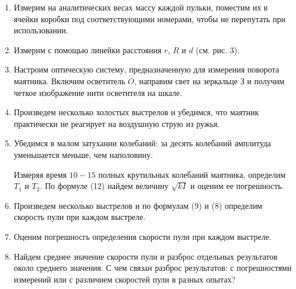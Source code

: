 \documentclass[14pt]{article}
\begin{document}
\begin{flushleft}
\begin{enumerate}
\item  Измерим на аналитических весах массу каждой пульки, поместим их в ячейки коробки под соответствующими номерами, чтобы не перепутать при использовании. 

\item  Измерим с помощью линейки расстояния $r$, $R$ и $d$ (см. рис. 3).

\item Настроим оптическую систему, предназначенную для измерения поворота маятника. Включим осветитель $O$, направим свет на зеркальце 
$\text{З}$ и получим четкое изображение нити осветителя на шкале.

\item Произведем  несколько холостых выстрелов и убедимся, что маятник практически не реагирует на воздушную струю из ружья.

\item Убедимся в малом затухании колебаний: за десять колебаний амплитуда уменьшается меньше, чем наполовину.

Измеряя время $10-15$ полных крутильных колебаний маятника, определим $T_1$ и $T_2$. По формуле (12) найдем величину $\sqrt{kI}$ и оценим ее погрешность.

\item Произведем несколько выстрелов и по формулам (9) и (8) определим скорость пули при каждом выстреле.

\item Оценим погрешносгь определения скорости пули при каждом выстреле.

\item Найдем среднее значение скорости пули и разброс отдельных результатов около среднего значения. С чем связан разброс результатов: с погрешностями измерений или с различием скоростей пули в разных  опытах?
\end{enumerate}
\end{flushleft}
\end{document}
